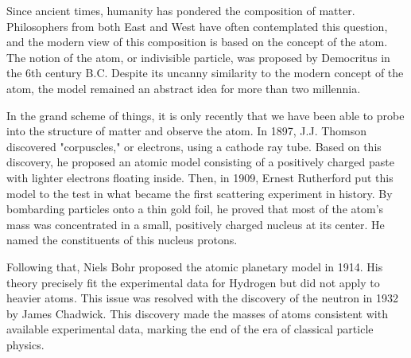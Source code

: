 Since ancient times, humanity has pondered the composition of matter.
Philosophers from both East and West have often contemplated this question, and the modern view of this composition is based on the concept of the atom.
The notion of the atom, or indivisible particle, was proposed by Democritus in the 6th century B.C.
Despite its uncanny similarity to the modern concept of the atom, the model remained an abstract idea for more than two millennia.

In the grand scheme of things, it is only recently that we have been able to probe into the structure of matter and observe the atom.
In 1897, J.J. Thomson discovered "corpuscles," or electrons, using a cathode ray tube.
Based on this discovery, he proposed an atomic model consisting of a positively charged paste with lighter electrons floating inside.
Then, in 1909, Ernest Rutherford put this model to the test in what became the first scattering experiment in history.
By bombarding \textalpha particles onto a thin gold foil, he proved that most of the atom's mass was concentrated in a small, positively charged nucleus at its center.
He named the constituents of this nucleus protons.

Following that, Niels Bohr proposed the atomic planetary model in 1914.
His theory precisely fit the experimental data for Hydrogen but did not apply to heavier atoms.
This issue was resolved with the discovery of the neutron in 1932 by James Chadwick.
This discovery made the masses of atoms consistent with available experimental data, marking the end of the era of classical particle physics.
